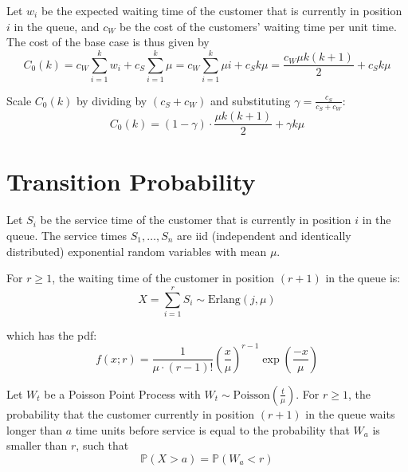 Let $w_{i}$ be the expected waiting time of the customer that is currently in position $i$ in the queue, and $c_{W}$ be the cost of the customers' waiting time per unit time. The cost of the base case is thus given by
\begin{equation}
 	C_{0} (k) = c_{W} \sum_{i = 1}^{k} w_{i} + c_{S} \sum_{i = 1}^{k} \mu = c_{W} \sum_{i = 1}^{k} \mu i + c_{S} k \mu = \frac{c_{W} \mu k (k + 1)}{2} + c_{S} k \mu
\end{equation}

Scale $C_{0} (k)$ by dividing by $(c_{S} + c_{W})$ and substituting $\gamma = \frac{c_{S}}{c_{S} + c_{W}}$:
\begin{equation}
	C_{0} (k) = (1 - \gamma) \cdot \frac{\mu k (k + 1)}{2} + \gamma k \mu
\end{equation}

\section{Transition Probability}

Let $S_{i}$ be the service time of the customer that is currently in position $i$ in the queue. The service times $S_{1}, \ldots, S_{n}$ are iid (independent and identically distributed) exponential random variables with mean $\mu$.

For $r \geq 1$, the waiting time of the customer in position $(r + 1)$ in the queue is:
\begin{equation}
	X = \sum_{i = 1}^{r} S_{i} \sim \text{Erlang}(j, \mu)
\end{equation}

which has the pdf:
\begin{equation}
	f (x; r) = \frac{1}{\mu \cdot (r - 1)!} \left( \frac{x}{\mu} \right)^{r - 1} \exp \left( \frac{-x}{\mu} \right)
\end{equation}

Let $W_{t}$ be a Poisson Point Process with $W_{t} \sim \text{Poisson} \left( \frac{t}{\mu} \right)$. For $r \geq 1$, the probability that the customer currently in position $(r + 1)$ in the queue waits longer than $a$ time units before service is equal to the probability that $W_{a}$ is smaller than $r$, such that
\begin{equation}
	\mathbb{P} (X > a) = \mathbb{P} (W_{a} < r)
\end{equation}

